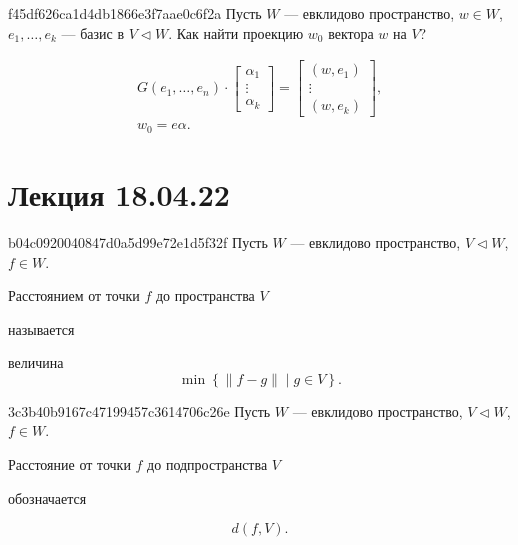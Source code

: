 \begin{note}{f45df626ca1d4db1866e3f7aae0c6f2a}
    Пусть \({ W }\) --- евклидово пространство, \({ w \in W }\), \({ e_1, \ldots, e_k }\) --- базис в \({ V \triangleleft W }\).
    Как найти проекцию \({ w_0 }\) вектора \({ w }\) на \({ V }\)?

    \begin{cloze}{1}
        \[
            \begin{gathered}
                G(e_1, \ldots, e_n) \cdot \begin{bmatrix}
                    \alpha_1 \\ \vdots \\ \alpha_k
                \end{bmatrix}
                =
                \begin{bmatrix}
                    (w, e_1) \\ \vdots \\ (w, e_k)
                \end{bmatrix}, \\
                w_0 = e\alpha.
            \end{gathered}
        \]
    \end{cloze}
\end{note}

\section{Лекция 18.04.22}
\begin{note}{b04c0920040847d0a5d99e72e1d5f32f}
    Пусть \({ W }\) --- евклидово пространство, \({ V \triangleleft W }\), \({ f \in W }\).
    \begin{icloze}{2}Расстоянием от точки \({ f }\) до пространства \({ V }\)\end{icloze} называется \begin{icloze}{1}величина
    \[
        \min \left\{ \left\lVert f - g \right\rVert \mid g \in V \right\}.
    \]\end{icloze}
\end{note}

\begin{note}{3c3b40b9167c47199457c3614706c26e}
    Пусть \({ W }\) --- евклидово пространство, \({ V \triangleleft W }\), \({ f \in W }\).
    \begin{icloze}{1}Расстояние от точки \({ f }\) до подпространства \({ V }\)\end{icloze} обозначается
    \begin{icloze}{2}
        \[
            d(f, V).
        \]
    \end{icloze}
\end{note}

